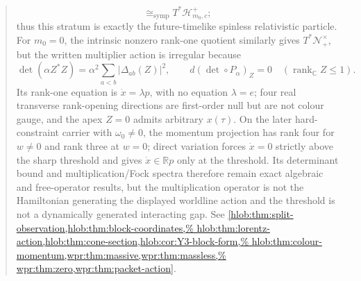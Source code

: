 \documentclass[11pt,letterpaper]{article}
\theoremstyle{definition}
\theoremstyle{remark}
\begin{document}
\begin{abstract}
\[  \cong_{\mathrm{symp}}T^*\mathcal H^+_{m_0,c};
 \]
 thus this stratum is exactly the future-timelike spinless relativistic
 particle.  For \(m_0=0\), the intrinsic nonzero rank-one quotient similarly
 gives \(T^*\mathcal N_+^\times\), but the written multiplier action is
 irregular because
 \[
  \det(\alpha Z^*Z)=\alpha^2\sum_{a<b}|\Delta_{ab}(Z)|^2,
  \qquad d(\det\circ P_\alpha)_Z=0\quad
  (\operatorname{rank}_{\mathbb C}Z\leq1).
 \]
 Its rank-one equation is \(\dot x=\lambda p\), with no equation
 \(\lambda=e\); four real transverse rank-opening directions are
 first-order null but are not colour gauge, and the apex \(Z=0\) admits
 arbitrary \(x(\tau)\).  On the later hard-constraint carrier with
 \(\omega_0\ne0\), the momentum projection has rank four for \(w\ne0\) and
 rank three at \(w=0\); direct variation forces \(\dot x=0\) strictly above
 the sharp threshold and gives \(\dot x\in\mathbb Rp\) only at the threshold.
 Its determinant bound and multiplication/Fock spectra therefore remain exact
 algebraic and free-operator results, but the multiplication operator is not
 the Hamiltonian generating the displayed worldline action and the threshold
 is not a dynamically generated interacting gap.  See
 \cref{hlob:thm:split-observation,hlob:thm:block-coordinates,%
  hlob:thm:lorentz-action,hlob:thm:cone-section,hlob:cor:Y3-block-form,%
  hlob:thm:colour-momentum,wpr:thm:massive,wpr:thm:massless,%
  wpr:thm:zero,wpr:thm:packet-action}.


\end{abstract}
\end{document}
